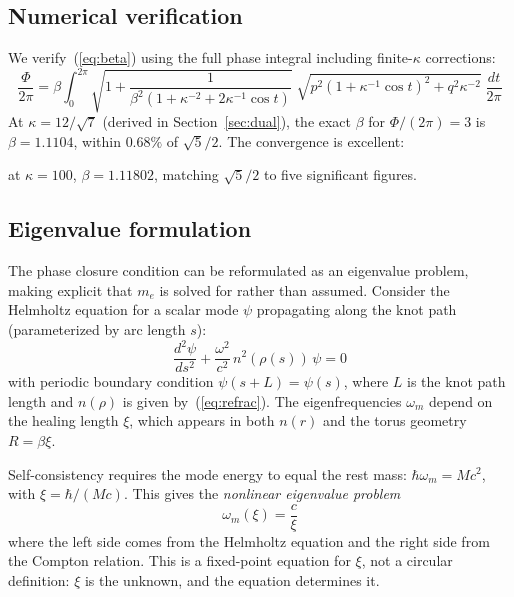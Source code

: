 \documentclass[11pt,a4paper]{article}
\begin{document}
\subsection{Numerical verification}

We verify~(\ref{eq:beta}) using the full phase integral including
finite-$\kappa$ corrections:
\begin{equation}
  \frac{\Phi}{2\pi} = \beta \int_0^{2\pi}
    \sqrt{1 + \frac{1}{\beta^2(1 + \kappa^{-2} + 2\kappa^{-1}\cos t)}}
    \;\sqrt{p^2(1+\kappa^{-1}\cos t)^2 + q^2\kappa^{-2}}\;
    \frac{dt}{2\pi}
  \label{eq:full_integral}
\end{equation}
At $\kappa = 12/\sqrt{7}$ (derived in Section~\ref{sec:dual}),
the exact $\beta$ for $\Phi/(2\pi) = 3$ is $\beta = 1.1104$,
within $0.68\%$ of $\sqrt{5}/2$.  The convergence is excellent:

at $\kappa = 100$, $\beta = 1.11802$, matching $\sqrt{5}/2$ to
five significant figures.

\subsection{Eigenvalue formulation}
\label{sec:eigenvalue}

The phase closure condition can be reformulated as an eigenvalue
problem, making explicit that $m_e$ is solved for rather than assumed.
Consider the Helmholtz equation for a scalar mode $\psi$ propagating
along the knot path (parameterized by arc length $s$):
\begin{equation}
  \frac{d^2\psi}{ds^2} + \frac{\omega^2}{c^2}\,n^2(\rho(s))\,\psi = 0
  \label{eq:helmholtz}
\end{equation}
with periodic boundary condition $\psi(s + L) = \psi(s)$, where
$L$ is the knot path length and $n(\rho)$ is given
by~(\ref{eq:refrac}).  The eigenfrequencies $\omega_m$ depend on
the healing length $\xi$, which appears in both $n(r)$ and the
torus geometry $R = \beta\xi$.

Self-consistency requires the mode energy to equal the rest mass:
$\hbar\omega_m = Mc^2$, with $\xi = \hbar/(Mc)$.  This gives the
\emph{nonlinear eigenvalue problem}
\begin{equation}
  \omega_m(\xi) = \frac{c}{\xi}
  \label{eq:nonlinear_ev}
\end{equation}
where the left side comes from the Helmholtz equation and the
right side from the Compton relation.  This is a fixed-point
equation for $\xi$, not a circular definition: $\xi$ is the
unknown, and the equation determines it.
\end{document}
